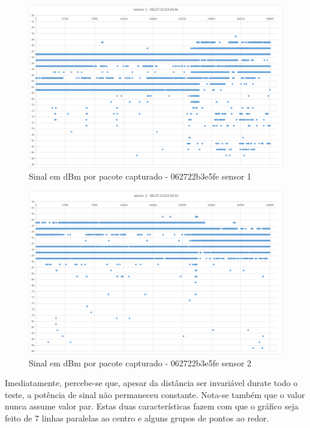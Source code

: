 \begin{figure}[htb]
	\centering
	\caption{\label{fig-062722b3e5fe-s1}Sinal em dBm por pacote capturado - 062722b3e5fe sensor 1}
	\includegraphics[width=1\textwidth]{060-testes/data-analisis/night-run/062722b3e5fe-sensor-01.png}
\end{figure}

\begin{figure}[htb]
	\centering
	\caption{\label{fig-062722b3e5fe-s2}Sinal em dBm por pacote capturado - 062722b3e5fe sensor 2}
	\includegraphics[width=1\textwidth]{060-testes/data-analisis/night-run/062722b3e5fe-sensor-02.png}
\end{figure}

\clearpage

Imediatamente, percebe-se que, apesar da distância ser invariável durate todo o
teste, a potência de sinal
não permaneceu constante. Nota-se também que o valor
nunca assume valor par. Estas duas características fazem com que o gráfico
seja feito de 7 linhas paralelas ao centro e alguns grupos de pontos ao redor.

